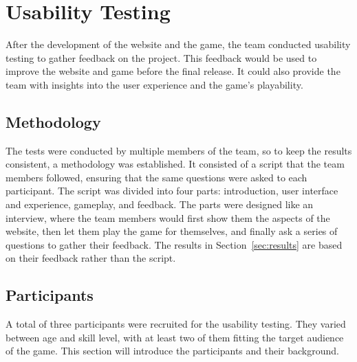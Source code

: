 \chapter{Usability Testing}\label{ch:user-test}

After the development of the website and the game,
the team conducted usability testing to gather feedback on the project.
This feedback would be used to improve the website and game before the final release.
It could also provide the team with insights into the user experience and the game's playability.


\section{Methodology}\label{sec:methodology}

The tests were conducted by multiple members of the team, so to keep the results consistent, a methodology was
established.
It consisted of a script that the team members followed, ensuring that the same questions were asked to each
participant.
The script was divided into four parts: introduction, user interface and experience, gameplay, and feedback.
The parts were designed like an interview, where the team members would first show them the aspects of the website,
then let them play the game for themselves, and finally ask a series of questions to gather their feedback.
The results in Section~\ref{sec:results} are based on their feedback rather than the script.


\section{Participants}\label{sec:participants}

A total of three participants were recruited for the usability testing.
They varied between age and skill level, with at least two of them fitting the target audience of the game.
This section will introduce the participants and their background.

